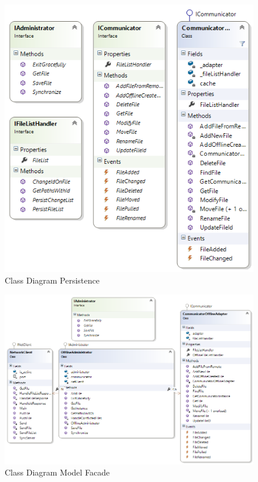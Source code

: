 \begin{figure}[H]
  \includegraphics[width=\textwidth]{illustrations/classDiagrams/partPersistence.png}
  \caption{Class Diagram Persistence}
\end{figure}
\begin{figure}[H]
  \includegraphics[width=\textwidth]{illustrations/classDiagrams/ModelFacade_CD.png}
  \caption{Class Diagram Model Facade}
\end{figure}
